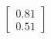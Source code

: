 \documentclass[preview]{standalone}
\begin{document}
\begin{align*}
\begin{bmatrix} 0.81 \\ 0.51 \end{bmatrix}
\end{align*}
\end{document}
